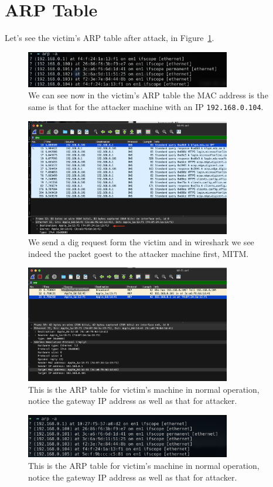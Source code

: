 \documentclass{article}
\def\c#1{\texttt{#1}}
\begin{document}
\section{ARP Table}
Let's see the victim's ARP table after attack, in Figure~\ref{fig:arp-pois}.

\begin{figure}[ht]
	\centering
	\includegraphics[width=0.8\textwidth]{figures/poisoned-arp.png}
  \caption{We can see now in the victim's ARP table the MAC address is the same is that for the attacker machine with an IP \c{192.168.0.104}.}
	\label{fig:arp-pois}
\end{figure}


\begin{figure}[ht]
	\centering
	\includegraphics[width=0.8\textwidth]{figures/dns-after.png}
  \caption{We send a dig request form the victim and in wireshark we see indeed the packet goest to the attacker machine first, MITM.}
	\label{fig:get-mac}
\end{figure}

\begin{figure}[ht]
	\centering
	\includegraphics[width=0.8\textwidth]{figures/wire-arp-res.png}
  \caption{This is the ARP table for victim's machine in normal operation, notice the gateway IP address as well as that for attacker.}
	\label{fig:get-mac}
\end{figure}

\begin{figure}[ht]
	\centering
	\includegraphics[width=0.8\textwidth]{figures/arp-norm.png}
  \caption{This is the ARP table for victim's machine in normal operation, notice the gateway IP address as well as that for attacker.}
	\label{fig:get-mac}
\end{figure}
\end{document}
